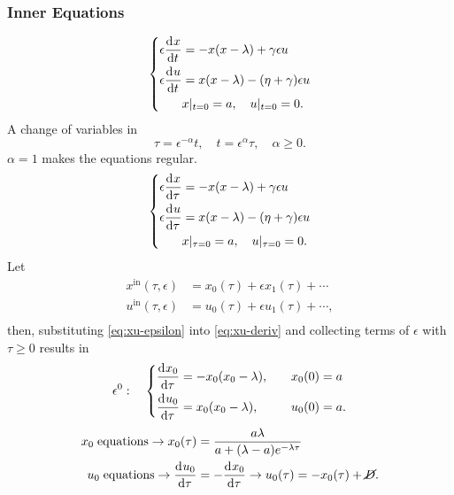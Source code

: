 \documentclass[12pt,twoside]{article}
\begin{document}
\subsubsection{Inner Equations}
\begin{equation*}
  \left\{
    \begin{aligned}
      \epsilon \frac{\mathrm{d}^{} {x}}{\mathrm{d}{t}^{}} &= -x(x-\lambda) + \gamma\epsilon u \\
      \epsilon \frac{\mathrm{d}^{} {u}}{\mathrm{d}{t}^{}} &= x(x-\lambda)-(\eta + \gamma)\epsilon u \\
      & x |_{t=0} = a,\quad u |_{t=0} = 0.
    \end{aligned}
  \right.
\end{equation*}
A change of variables in
$$\tau=\epsilon^{-\alpha}t,\quad t=\epsilon^{\alpha}\tau,\quad \alpha\ge0.$$
$\alpha=1$ makes the equations regular.
\begin{equation}
  \label{eq:xu-deriv}
  \left\{
    \begin{aligned}
      \epsilon \frac{\mathrm{d}^{} {x}}{\mathrm{d}{\tau}^{}} &= -x(x-\lambda) + \gamma\epsilon u \\
      \epsilon \frac{\mathrm{d}^{} {u}}{\mathrm{d}{\tau}^{}} &= x(x-\lambda)-(\eta + \gamma)\epsilon u \\
      & x |_{\tau=0} = a,\quad u |_{\tau=0} = 0.
    \end{aligned}
  \right.
\end{equation}
Let
\begin{equation}
  \label{eq:xu-epsilon}
  \begin{aligned}
    x^{\text{in}}(\tau,\epsilon) &= x_0(\tau) + \epsilon x_1(\tau) + \cdots \\
    u^{\text{in}}(\tau,\epsilon) &= u_0(\tau) + \epsilon u_1(\tau) + \cdots, \\
  \end{aligned}
\end{equation}
then, substituting \cref{eq:xu-epsilon} into \cref{eq:xu-deriv} and collecting
terms of $\epsilon$ with $\tau\ge0$ results in
\begin{equation*}
  \epsilon^0: \quad \left\{
    \begin{aligned}
      \frac{\mathrm{d}^{} {x_0}}{\mathrm{d}{\tau}^{}} &= -x_0(x_0-\lambda), &\quad x_0(0) &= a \\
      \frac{\mathrm{d}^{} {u_0}}{\mathrm{d}{\tau}^{}} &= x_0(x_0-\lambda), &\quad u_0(0) &= a. \\
    \end{aligned}
  \right.
\end{equation*}
\begin{equation*}
  \begin{aligned}
    x_0 \;\text{equations} \rightarrow x_0(\tau) &=
    \frac{a\lambda}{a+(\lambda-a)e^{-\lambda\tau}} \\
    u_0 \;\text{equations} \rightarrow \frac{\mathrm{d}^{} {u_0}}{\mathrm{d}{\tau}^{}} &=
    -\frac{\mathrm{d}^{} {x_0}}{\mathrm{d}{\tau}^{}} \rightarrow u_0(\tau) = -x_0(\tau) + \cancel{D}.
  \end{aligned}
\end{equation*}
\end{document}
